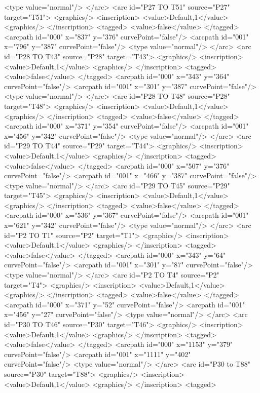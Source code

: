 <type value="normal"/>
</arc>
<arc id="P27 TO T51" source="P27" target="T51">
<graphics/>
<inscription>
<value>Default,1</value>
<graphics/>
</inscription>
<tagged>
<value>false</value>
</tagged>
<arcpath id="000" x="837" y="376" curvePoint="false"/>
<arcpath id="001" x="796" y="387" curvePoint="false"/>
<type value="normal"/>
</arc>
<arc id="P28 TO T43" source="P28" target="T43">
<graphics/>
<inscription>
<value>Default,1</value>
<graphics/>
</inscription>
<tagged>
<value>false</value>
</tagged>
<arcpath id="000" x="343" y="364" curvePoint="false"/>
<arcpath id="001" x="301" y="387" curvePoint="false"/>
<type value="normal"/>
</arc>
<arc id="P28 TO T48" source="P28" target="T48">
<graphics/>
<inscription>
<value>Default,1</value>
<graphics/>
</inscription>
<tagged>
<value>false</value>
</tagged>
<arcpath id="000" x="371" y="354" curvePoint="false"/>
<arcpath id="001" x="456" y="342" curvePoint="false"/>
<type value="normal"/>
</arc>
<arc id="P29 TO T44" source="P29" target="T44">
<graphics/>
<inscription>
<value>Default,1</value>
<graphics/>
</inscription>
<tagged>
<value>false</value>
</tagged>
<arcpath id="000" x="507" y="376" curvePoint="false"/>
<arcpath id="001" x="466" y="387" curvePoint="false"/>
<type value="normal"/>
</arc>
<arc id="P29 TO T45" source="P29" target="T45">
<graphics/>
<inscription>
<value>Default,1</value>
<graphics/>
</inscription>
<tagged>
<value>false</value>
</tagged>
<arcpath id="000" x="536" y="367" curvePoint="false"/>
<arcpath id="001" x="621" y="342" curvePoint="false"/>
<type value="normal"/>
</arc>
<arc id="P2 TO T1" source="P2" target="T1">
<graphics/>
<inscription>
<value>Default,1</value>
<graphics/>
</inscription>
<tagged>
<value>false</value>
</tagged>
<arcpath id="000" x="343" y="64" curvePoint="false"/>
<arcpath id="001" x="301" y="87" curvePoint="false"/>
<type value="normal"/>
</arc>
<arc id="P2 TO T4" source="P2" target="T4">
<graphics/>
<inscription>
<value>Default,1</value>
<graphics/>
</inscription>
<tagged>
<value>false</value>
</tagged>
<arcpath id="000" x="371" y="52" curvePoint="false"/>
<arcpath id="001" x="456" y="27" curvePoint="false"/>
<type value="normal"/>
</arc>
<arc id="P30 TO T46" source="P30" target="T46">
<graphics/>
<inscription>
<value>Default,1</value>
<graphics/>
</inscription>
<tagged>
<value>false</value>
</tagged>
<arcpath id="000" x="1153" y="379" curvePoint="false"/>
<arcpath id="001" x="1111" y="402" curvePoint="false"/>
<type value="normal"/>
</arc>
<arc id="P30 to T88" source="P30" target="T88">
<graphics/>
<inscription>
<value>Default,1</value>
<graphics/>
</inscription>
<tagged>
